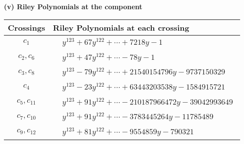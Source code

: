 \documentclass[1p]{elsarticle_modified}
\theoremstyle{definition}
\begin{document}
\newpage\renewcommand{\arraystretch}{1}
\flushleft \textbf{(v) Riley Polynomials at the component}\newline \\
\begin{tabular}{m{50pt}|m{274pt}}
Crossings & \hspace{64pt}Riley Polynomials at each crossing \\
\hline $$\begin{aligned}c_{1}\end{aligned}$$&$\begin{aligned}
&y^{123}+67 y^{122}+\cdots+7218 y-1
\end{aligned}$\\
\hline $$\begin{aligned}c_{2},c_{6}\end{aligned}$$&$\begin{aligned}
&y^{123}+47 y^{122}+\cdots-78 y-1
\end{aligned}$\\
\hline $$\begin{aligned}c_{3},c_{8}\end{aligned}$$&$\begin{aligned}
&y^{123}-79 y^{122}+\cdots+21540154796 y-9737150329
\end{aligned}$\\
\hline $$\begin{aligned}c_{4}\end{aligned}$$&$\begin{aligned}
&y^{123}-23 y^{122}+\cdots+63443203538 y-1584915721
\end{aligned}$\\
\hline $$\begin{aligned}c_{5},c_{11}\end{aligned}$$&$\begin{aligned}
&y^{123}+91 y^{122}+\cdots-210187966472 y-39042993649
\end{aligned}$\\
\hline $$\begin{aligned}c_{7},c_{10}\end{aligned}$$&$\begin{aligned}
&y^{123}+91 y^{122}+\cdots-3783445264 y-11785489
\end{aligned}$\\
\hline $$\begin{aligned}c_{9},c_{12}\end{aligned}$$&$\begin{aligned}
&y^{123}+81 y^{122}+\cdots-9554859 y-790321
\end{aligned}$\\
\hline
\end{tabular}\\~\\
\end{document}
